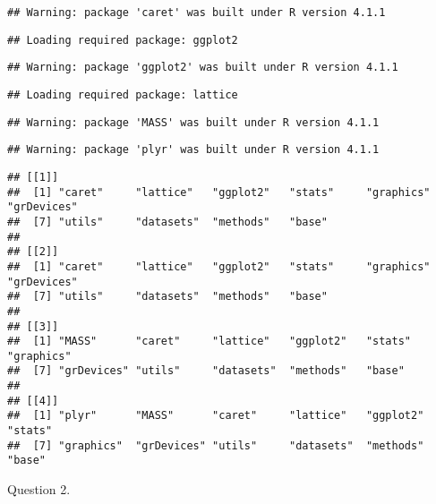 \documentclass[
]{article}
\newenvironment{Shaded}{\begin{snugshade}}{\end{snugshade}}
\newcommand{\AttributeTok}[1]{\textcolor[rgb]{0.77,0.63,0.00}{#1}}
\newcommand{\CommentTok}[1]{\textcolor[rgb]{0.56,0.35,0.01}{\textit{#1}}}
\newcommand{\DecValTok}[1]{\textcolor[rgb]{0.00,0.00,0.81}{#1}}
\newcommand{\FunctionTok}[1]{\textcolor[rgb]{0.00,0.00,0.00}{#1}}
\newcommand{\NormalTok}[1]{#1}
\newcommand{\OtherTok}[1]{\textcolor[rgb]{0.56,0.35,0.01}{#1}}
\newcommand{\SpecialCharTok}[1]{\textcolor[rgb]{0.00,0.00,0.00}{#1}}
\newcommand{\StringTok}[1]{\textcolor[rgb]{0.31,0.60,0.02}{#1}}
\begin{document}
\begin{verbatim}
## Warning: package 'caret' was built under R version 4.1.1
\end{verbatim}

\begin{verbatim}
## Loading required package: ggplot2
\end{verbatim}

\begin{verbatim}
## Warning: package 'ggplot2' was built under R version 4.1.1
\end{verbatim}

\begin{verbatim}
## Loading required package: lattice
\end{verbatim}

\begin{verbatim}
## Warning: package 'MASS' was built under R version 4.1.1
\end{verbatim}

\begin{verbatim}
## Warning: package 'plyr' was built under R version 4.1.1
\end{verbatim}

\begin{verbatim}
## [[1]]
##  [1] "caret"     "lattice"   "ggplot2"   "stats"     "graphics"  "grDevices"
##  [7] "utils"     "datasets"  "methods"   "base"     
## 
## [[2]]
##  [1] "caret"     "lattice"   "ggplot2"   "stats"     "graphics"  "grDevices"
##  [7] "utils"     "datasets"  "methods"   "base"     
## 
## [[3]]
##  [1] "MASS"      "caret"     "lattice"   "ggplot2"   "stats"     "graphics" 
##  [7] "grDevices" "utils"     "datasets"  "methods"   "base"     
## 
## [[4]]
##  [1] "plyr"      "MASS"      "caret"     "lattice"   "ggplot2"   "stats"    
##  [7] "graphics"  "grDevices" "utils"     "datasets"  "methods"   "base"
\end{verbatim}

Question 2.

\begin{Shaded}
\end{Shaded}
\end{document}
